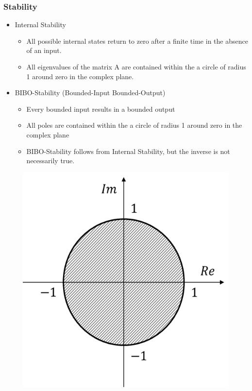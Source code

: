 \begin{frame}
	\frametitle{Stability}
	\begin{itemize}
		\item Internal Stability
		\begin{itemize}
			\item All possible internal states return to zero after a finite time in the absence of an input.
			\item 	All eigenvalues of the matrix A are contained within the a circle of radius 1 around zero in the complex plane.
		\end{itemize}
		\item BIBO-Stability (Bounded-Input Bounded-Output)
		\begin{itemize}
			\item Every bounded input results in a bounded output
			\item All poles are contained within the a circle of radius 1 around zero in the complex plane
			\item BIBO-Stability follows from Internal Stability, but the inverse is not necessarily true.
		\end{itemize}
	\end{itemize}
\end{frame}
\begin{frame}
\begin{figure}
\centering
\includegraphics[height=0.7\textheight]{Images/discrete_time_systems_27}
\label{fig:discrete_time_systems_27}
\end{figure}
\end{frame}
